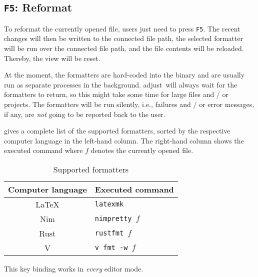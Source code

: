 \documentclass[11pt, a4paper, british]{scrartcl}
\DeclareRobustCommand{\adjust}{\textsf{adjust}}
\begin{document}
\subsection{\texttt{F5}:  Reformat}
\label{sec:f5-reformat}
To reformat the currently opened file, users just need to press \texttt{F5}.
The recent changes will then be written to the connected file path, the selected
formatter will be run over the connected file path, and the file contents will
be reloaded.  Thereby, the view will be reset.

At the moment, the formatters are hard-coded into the binary and are usually run
as separate processes in the background.  \adjust\ will always wait for the
formatters to return, so this might take some time for large files and / or
projects.  The formatters will be run silently, i.e., failures and / or error
messages, if any, are \emph{not} going to be reported back to the user.

 gives a complete list of the supported formatters, sorted
by the respective computer language in the left-hand column.  The right-hand
column shows the executed command where \texttt{$f$} denotes the currently opened
file.

\begin{table}
\centering
\caption{Supported formatters}
\label{tab:formatters}
\begin{tabular}{cl}
\toprule
Computer language   & Executed command          \\
\midrule
\LaTeX              & \texttt{latexmk}          \\
Nim                 & \texttt{nimpretty $f$}    \\
Rust                & \texttt{rustfmt $f$}      \\
V                   & \texttt{v fmt -w $f$}     \\
\bottomrule
\end{tabular}
\end{table}

This key binding works in \emph{every} editor mode.

\end{document}
